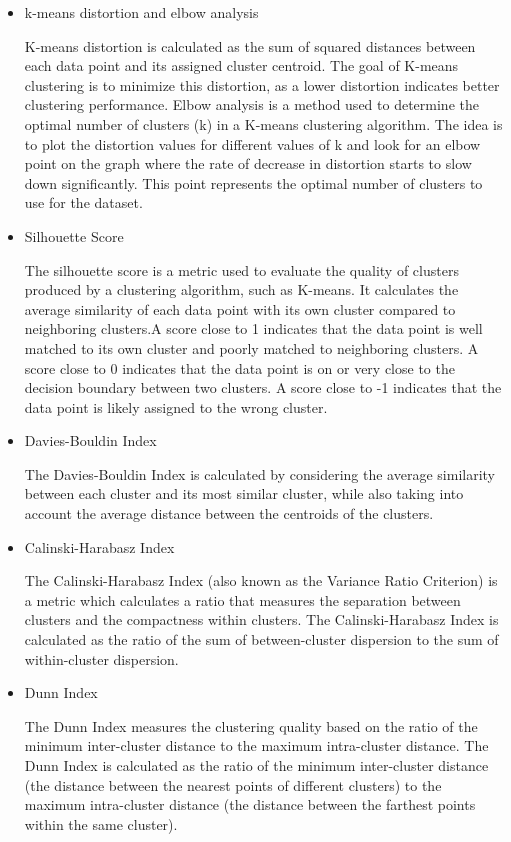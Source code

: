 \documentclass{article}
\begin{document}
\begin{itemize}
    \item k-means distortion and elbow analysis

    K-means distortion is calculated as the sum of squared distances between each data point and its assigned cluster centroid.
    The goal of K-means clustering is to minimize this distortion, as a lower distortion indicates better clustering performance.
    Elbow analysis is a method used to determine the optimal number of clusters (k) in a K-means clustering algorithm.
     The idea is to plot the distortion values for different values of k and look for an elbow point on the graph
      where the rate of decrease in distortion starts to slow down significantly.
     This point represents the optimal number of clusters to use for the dataset. 

    \item Silhouette Score
    
    The silhouette score is a metric used to evaluate the quality of
     clusters produced by a clustering algorithm, such as K-means.
      It calculates the average similarity of each data point with its own
     cluster compared to neighboring clusters.A score close to 1 indicates 
     that the data point is well matched to its own cluster and poorly matched to neighboring clusters.
     A score close to 0 indicates that the data point is on or very close to the decision boundary between two clusters.
     A score close to -1 indicates that the data point is likely assigned to the wrong cluster.

    \item Davies-Bouldin Index
    
    The Davies-Bouldin Index is calculated by considering
     the average similarity between each cluster and its most similar cluster,
      while also taking into account the average distance between the centroids of
       the clusters.

    \item Calinski-Harabasz Index
    
    The Calinski-Harabasz Index (also known as the Variance Ratio Criterion) is a metric which calculates a ratio that measures the separation between clusters and the compactness within clusters.
    The Calinski-Harabasz Index is calculated as the ratio of the sum of between-cluster dispersion to the sum of within-cluster dispersion.

    \item Dunn Index
    
    The Dunn Index measures the clustering quality based on the ratio of the minimum inter-cluster distance to the maximum intra-cluster distance.
    The Dunn Index is calculated as the ratio of the minimum inter-cluster distance
     (the distance between the nearest points of different clusters)
      to the maximum intra-cluster distance (the distance between the farthest points within the same cluster).
\end{itemize}
\end{document}

